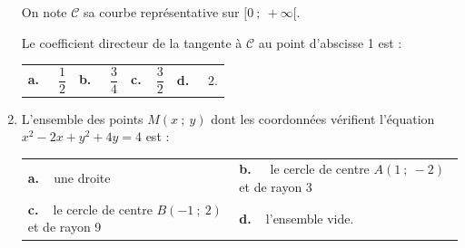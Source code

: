 \documentclass[10pt]{article}
\begin{document}
\begin{enumerate}
On note $\mathscr{C}$ sa courbe représentative sur $[0~;~+\infty[$.

Le coefficient directeur de la tangente à $\mathscr{C}$ au point d'abscisse 1 est :

\medskip

\begin{tabularx}{1.05\linewidth}{*{4}{X}}
\textbf{a.~~} $ \dfrac{1}{2}$ &\textbf{b.~~} $\dfrac{3}{4} $&\textbf{c.~~}$\dfrac{3}{2} $& \textbf{d.~~} $ 2 $.
\end{tabularx}

\item L'ensemble des points $M(x~;~y)$ dont les coordonnées vérifient l'équation $x^2-2x+y^2+4y=4$ est :

\medskip

\begin{tabularx}{1.05\linewidth}{*{2}{X}}
\textbf{a.~~}une droite $ $ &\textbf{b.~~} \small le cercle de centre $ A(1~;~-2)$ et de rayon 3\\\textbf{c.~~}\small le cercle de centre $ B(-1~;~2)$ et de rayon 9& \textbf{d.~~}l'ensemble vide.
\end{tabularx}
\end{enumerate}

\vspace{0,5cm}
\end{document}
